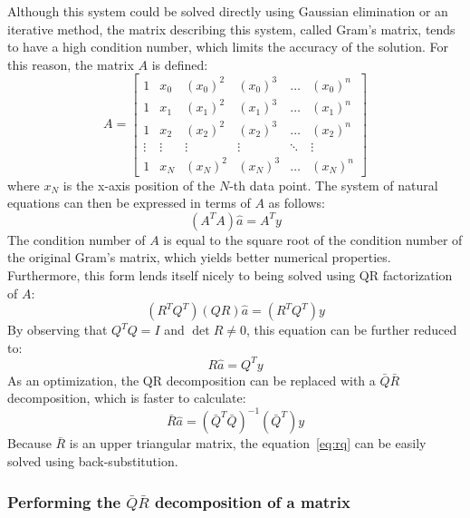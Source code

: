 \documentclass{article}
\begin{document}
	Although this system could be solved directly using Gaussian elimination
	or an iterative method, the matrix describing this system, called Gram's
	matrix, tends to have a high condition number, which limits the accuracy
	of the solution. For this reason, the matrix $A$ is defined:
	\begin{equation}
		A = \begin{bmatrix}
			1 & x_0 & (x_0)^2 & (x_0)^3 & \dots & (x_0)^n \\
			1 & x_1 & (x_1)^2 & (x_1)^3 & \dots & (x_1)^n \\
			1 & x_2 & (x_2)^2 & (x_2)^3 & \dots & (x_2)^n \\
			\vdots & \vdots & \vdots & \vdots & \ddots & \vdots \\
			1 & x_N & (x_N)^2 & (x_N)^3 & \dots & (x_N)^n
		\end{bmatrix}
	\end{equation}
	where $x_N$ is the x-axis position of the $N$-th data point. The system
	of natural equations can then be expressed in terms of $A$ as follows:
	\begin{equation}
		(A^TA)\widehat{a} = A^Ty
	\end{equation}
	The condition number of $A$ is equal to the square root of the condition
	number of the original Gram's matrix, which yields better numerical
	properties. Furthermore, this form lends itself nicely to being solved
	using QR factorization of $A$:
	\begin{equation}
		(R^TQ^T)(QR)\widehat{a} = (R^TQ^T)y
	\end{equation}
	By observing that $Q^TQ = I$ and $\det{R} \neq 0$, this equation can be
	further reduced to:
	\begin{equation}
		R\widehat{a} = Q^Ty
	\end{equation}
	As an optimization, the QR decomposition can be replaced with a $\bar{Q}
	\bar{R}$ decomposition, which is faster to calculate:
	\begin{equation}
		\bar{R}\widehat{a} = (\bar{Q}^T\bar{Q})^{-1}(\bar{Q}^T)y
		\label{eq:rq}
	\end{equation}
	Because $\bar{R}$ is an upper triangular matrix, the
	equation~\ref{eq:rq} can be easily solved using back-substitution.
	
	\subsubsection{Performing the $\bar{Q}\bar{R}$ decomposition of a
	matrix}
	
\end{document}

